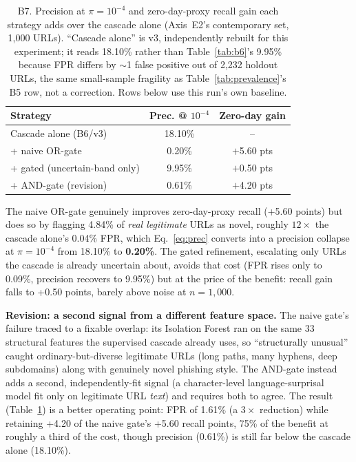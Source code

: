 \documentclass[conference]{IEEEtran}
\begin{document}
\begin{table}[t]
\caption{B7. Precision at $\pi=10^{-4}$ and zero-day-proxy recall gain
each strategy adds over the cascade alone (Axis~E2's contemporary set,
1{,}000 URLs). ``Cascade alone'' is v3, independently rebuilt for this
experiment; it reads 18.10\% rather than Table~\ref{tab:b6}'s 9.95\%
because FPR differs by $\sim$1 false positive out of 2{,}232 holdout URLs, the
same small-sample fragility as Table~\ref{tab:prevalence}'s B5
row, not a correction. Rows below use this run's own baseline.}
\label{tab:b7}
\centering\footnotesize
\setlength{\tabcolsep}{4pt}
\begin{tabular}{@{}lcc@{}}
\toprule
\textbf{Strategy} & \textbf{Prec. @ $10^{-4}$} & \textbf{Zero-day gain}\\
\midrule
Cascade alone (B6/v3) & 18.10\% & -- \\
+ naive OR-gate                & 0.20\%  & $+$5.60 pts\\
+ gated (uncertain-band only)  & 9.95\%  & $+$0.50 pts\\
+ AND-gate (revision)          & 0.61\%  & $+$4.20 pts\\
\bottomrule
\end{tabular}
\end{table}

The naive OR-gate genuinely improves zero-day-proxy recall (+5.60 points)
but does so by flagging 4.84\% of \emph{real legitimate} URLs as novel, roughly $12\times$ the cascade alone's 0.04\% FPR, which
Eq.~\eqref{eq:prec} converts into a precision collapse at $\pi=10^{-4}$
from 18.10\% to \textbf{0.20\%}. The gated refinement, escalating only
URLs the cascade is already uncertain about, avoids that cost (FPR rises
only to 0.09\%, precision recovers to 9.95\%) but at the price of the
benefit: recall gain falls to +0.50 points, barely above noise at
$n{=}1{,}000$.

\textbf{Revision: a second signal from a different feature space.} The
naive gate's failure traced to a fixable overlap: its Isolation Forest
ran on the same 33 structural features the supervised cascade already
uses, so ``structurally unusual'' caught ordinary-but-diverse legitimate
URLs (long paths, many hyphens, deep subdomains) along with genuinely
novel phishing style. The AND-gate instead adds a second, independently-fit signal (a character-level
language-surprisal model fit only on legitimate URL \emph{text}) and
requires both to agree.
The result (Table~\ref{tab:b7}) is a better operating point: FPR of
1.61\% (a $3\times$ reduction) while retaining +4.20 of the naive gate's +5.60 recall points, 75\% of the
benefit at roughly a third of the cost, though precision (0.61\%) is still far below the cascade alone
(18.10\%).
\end{document}
